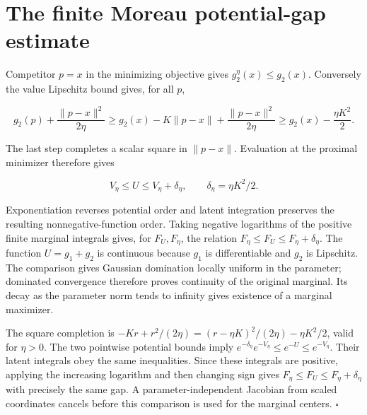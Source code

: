 \documentclass[11pt,a4paper]{article}
\begin{document}
\section{\texorpdfstring{The finite Moreau potential-gap estimate}{The finite Moreau potential-gap estimate}}



Competitor \(p=x\) in the minimizing objective gives \(g_2^\eta(x)\le g_2(x)\). Conversely the value Lipschitz bound gives, for all \(p\),

\[g_2(p)+\frac{\|p-x\|^2}{2\eta}
\ge g_2(x)-K\|p-x\|+\frac{\|p-x\|^2}{2\eta}
\ge g_2(x)-\frac{\eta K^2}{2}.\]

The last step completes a scalar square in \(\|p-x\|\). Evaluation at the proximal minimizer therefore gives

\[V_\eta\le U\le V_\eta+\delta_\eta,\qquad\delta_\eta=\eta K^2/2.\]

Exponentiation reverses potential order and latent integration preserves the resulting nonnegative-function order. Taking negative logarithms of the positive finite marginal integrals gives, for \(F_U,F_\eta\), the relation \(F_\eta\le F_U\le F_\eta+\delta_\eta\). The function \(U=g_1+g_2\) is continuous because \(g_1\) is differentiable and \(g_2\) is Lipschitz. The comparison gives Gaussian domination locally uniform in the parameter; dominated convergence therefore proves continuity of the original marginal. Its decay as the parameter norm tends to infinity gives existence of a marginal maximizer.




The square completion is \(-Kr+r^2/(2\eta)=(r-\eta K)^2/(2\eta)-\eta K^2/2\), valid for \(\eta>0\). The two pointwise potential bounds imply \(e^{-\delta_\eta}e^{-V_\eta}\le e^{-U}\le e^{-V_\eta}\). Their latent integrals obey the same inequalities. Since these integrals are positive, applying the increasing logarithm and then changing sign gives \(F_\eta\le F_U\le F_\eta+\delta_\eta\) with precisely the same gap. A parameter-independent Jacobian from scaled coordinates cancels before this comparison is used for the marginal centers. \(\square\)
\end{document}
